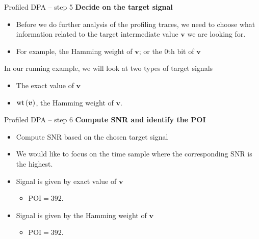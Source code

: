 \begin{frame}{Profiled DPA -- step 5}
    \textbf{Decide on the target signal}
    \begin{itemize}
        \item Before we do further analysis of the profiling traces, we need to choose what information related to the target intermediate value $\boldsymbol{v}$ we are looking for.
        \item For example, the Hamming weight of $\boldsymbol{v}$; or the $0$th bit of $\boldsymbol{v}$
    \end{itemize}
    \begin{example}
    In our running example, we will look at two types of target signals
        \begin{itemize}
            \item The exact value of $\boldsymbol{v}$
            \item $\textrm{wt}\left(\boldsymbol{v}\right)$, the Hamming weight of $\boldsymbol{v}$.
        \end{itemize}
    \end{example}
\end{frame}

\begin{frame}{Profiled DPA -- step 6}
    \textbf{Compute SNR and identify the POI}
    \begin{itemize}
        \item Compute SNR based on the chosen target signal
        \item We would like to focus on the time sample where the corresponding SNR is the highest.
    \end{itemize}
    \begin{example}
        \begin{itemize}
            \item Signal is given by exact value of $\boldsymbol{v}$
        \begin{itemize}
             \item $\text{POI}=392$.
        \end{itemize}
        \item Signal is given by the Hamming weight of $\boldsymbol{v}$
        \begin{itemize}
             \item $\text{POI}=392$.
        \end{itemize}
        \end{itemize}
    \end{example}
\end{frame}

